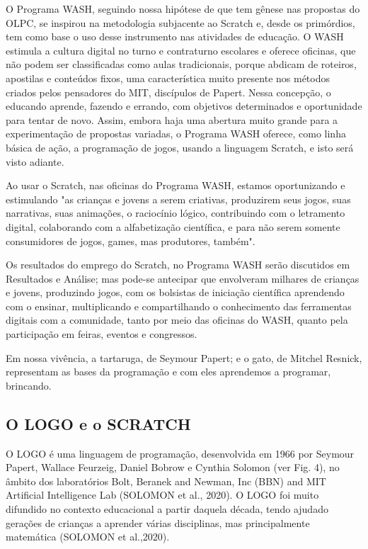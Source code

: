 O Programa WASH, seguindo nossa hipótese de que tem gênese nas propostas do OLPC, se inspirou na metodologia subjacente ao Scratch e, desde os primórdios, tem como base o uso desse instrumento nas atividades de educação. O WASH estimula a cultura digital no turno e contraturno escolares e oferece oficinas, que não podem ser classificadas como aulas tradicionais, porque abdicam de roteiros, apostilas e conteúdos fixos, uma característica muito presente nos métodos criados pelos pensadores do MIT, discípulos de Papert. Nessa concepção, o educando aprende, fazendo e errando, com objetivos determinados e oportunidade para tentar de novo. Assim, embora haja uma abertura muito grande para a experimentação de propostas variadas, o Programa WASH oferece, como linha básica de ação, a programação de jogos, usando a linguagem Scratch, e isto será visto adiante.

Ao usar o Scratch, nas oficinas do Programa WASH, estamos oportunizando e estimulando "as crianças e jovens a serem criativas, produzirem seus jogos, suas narrativas, suas animações, o raciocínio lógico, contribuindo com o letramento digital, colaborando com a alfabetização científica, e para não serem somente consumidores de jogos, games, mas produtores, também".

Os resultados do emprego do Scratch, no Programa WASH serão discutidos em Resultados e Análise; mas pode-se antecipar que envolveram milhares de crianças e jovens, produzindo jogos, com os bolsistas de iniciação científica aprendendo com o ensinar, multiplicando e compartilhando o conhecimento das ferramentas digitais  com a comunidade, tanto por meio das oficinas do WASH, quanto pela participação em feiras, eventos e congressos.

Em nossa vivência, a tartaruga, de Seymour Papert; e o gato, de Mitchel Resnick,  representam as bases da  programação e com eles aprendemos a  programar, brincando.

\subsection[O LOGO e o SCRATCH]{O LOGO e o SCRATCH}\label{O LOGO e o SCRATCH}
O LOGO é uma linguagem de programação, desenvolvida em 1966 por Seymour Papert, Wallace Feurzeig, Daniel Bobrow e Cynthia Solomon (ver Fig. 4), no âmbito dos laboratórios Bolt, Beranek and Newman, Inc (BBN) and MIT Artificial Intelligence Lab (SOLOMON et al., 2020). O LOGO foi muito difundido no contexto educacional a partir daquela década, tendo ajudado gerações de crianças a aprender várias disciplinas, mas principalmente matemática (SOLOMON et al.,2020).



